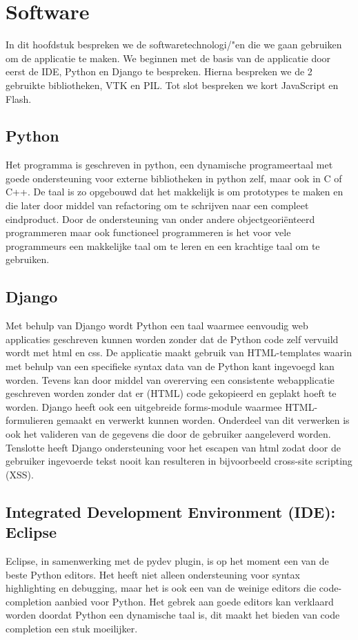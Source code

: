 \section{Software}
\label{Software}
In dit hoofdstuk bespreken we de softwaretechnologi/"{e}n die we gaan gebruiken om de applicatie te maken.
We beginnen met de basis van de applicatie door eerst de IDE, Python en Django te bespreken.
Hierna bespreken we de 2 gebruikte bibliotheken, VTK en PIL.
Tot slot bespreken we kort JavaScript en Flash.

\subsection{Python}
Het programma is geschreven in python, een dynamische programeertaal met goede ondersteuning voor externe bibliotheken in python zelf, maar ook in C of C++. De taal is zo opgebouwd dat het makkelijk is om prototypes te maken en die later door middel van refactoring om te schrijven naar een compleet eindproduct. Door de ondersteuning van onder andere objectgeori\"{e}nteerd programmeren maar ook functioneel programmeren is het voor vele programmeurs een makkelijke taal om te leren en een krachtige taal om te gebruiken.

\subsection{Django}
Met behulp van Django wordt Python een taal waarmee eenvoudig web applicaties geschreven kunnen worden zonder dat de Python code zelf vervuild wordt met html en css. De applicatie maakt gebruik van HTML-templates waarin met behulp van een specifieke syntax data van de Python kant ingevoegd kan worden. Tevens kan door middel van overerving een consistente webapplicatie geschreven worden zonder dat er (HTML) code gekopieerd en geplakt hoeft te worden. Django heeft ook een uitgebreide forms-module waarmee HTML-formulieren gemaakt en verwerkt kunnen worden. Onderdeel van dit verwerken is ook het valideren van de gegevens die door de gebruiker aangeleverd worden. Tenslotte heeft Django ondersteuning voor het escapen van html zodat door de gebruiker ingevoerde tekst nooit kan resulteren in bijvoorbeeld cross-site scripting (XSS).

\subsection{Integrated Development Environment (IDE): Eclipse}
Eclipse, in samenwerking met de pydev plugin, is op het moment een van de beste Python editors. Het heeft niet alleen ondersteuning voor syntax highlighting en debugging, maar het is ook een van de weinige editors die code-completion aanbied voor Python. Het gebrek aan goede editors kan verklaard worden doordat Python een dynamische taal is, dit maakt het bieden van code completion een stuk moeilijker.

